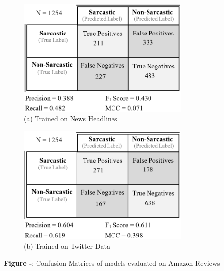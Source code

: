 \documentclass[12pt,a4paper]{article}
\begin{document}
\begin{minipage}{0.4\textwidth}
	\begin{figure}[H]
		\begin{center}
			\includegraphics[width=0.75\textwidth]{Images/cm2.png}\\
			(a) Trained on News Headlines\\
		\end{center}
	\end{figure}
\end{minipage}
\begin{minipage}{0.4\textwidth}
	\begin{figure}[H]
		\begin{center}
			\includegraphics[width=0.75\textwidth]{Images/cm1.png}\\
			(b) Trained on Twitter Data\\
		\end{center}
	\end{figure}
\end{minipage}\vspace{-15pt}

\begin{center}
	\textbf{Figure -}: Confusion Matrices of models evaluated on Amazon Reviews
\end{center}
\end{document}
